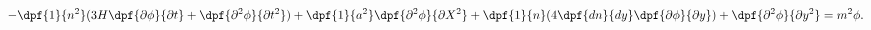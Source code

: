 \begin{equation} %
-\dpf{1}{n^2}(3H\dpf{\partial \phi}{\partial t}+\dpf{\partial ^2\phi}{\partial t^2})+\dpf{1}{a^2}\dpf{\partial ^2 \phi}{\partial X^2}+\dpf{1}{n}(4\dpf{dn}{dy}\dpf{\partial \phi}{\partial y})+\dpf{\partial ^2 \phi}{\partial y^2}=m^2 \phi .
\end{equation}

